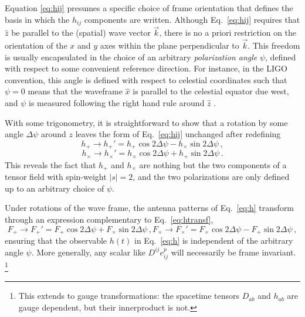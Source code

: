\documentclass[aps,prd,twocolumn,superscriptaddress,preprintnumbers,floatfix,nofootinbib]{revtex4-2}
\newcommand{\beq}{\begin{equation}}
\newcommand{\eeq}{\end{equation}}
\newcommand*{\eq}[1]{Eq.~\eqref{eq:#1}}
\begin{document}
Equation \eqref{eq:hij} presumes a specific choice of frame orientation that defines the basis in which the $h_{ij}$ components are written.
Although \eq{hij} requires that $\hat{z}$ be parallel to the (spatial) wave vector $\vec{k}$, there is no a priori restriction on the orientation of the $x$ and $y$ axes within the plane perpendicular to $\vec{k}$.
This freedom is usually encapsulated in the choice of an arbitrary \emph{polarization angle} $\psi$, defined with respect to some convenient reference direction.
For instance, in the LIGO convention, this angle is defined with respect to celestial coordinates such that $\psi=0$ means that the waveframe $\hat{x}$ is parallel to the celestial equator due west, and $\psi$ is measured following the right hand rule around $\hat{z}$ \cite{LALSuite:wave}.

With some trigonometry, it is straightforward to show that a rotation by some angle $\Delta \psi$ around $z$ leaves the form of \eq{hij} unchanged after redefining
\beq \label{eq:htransf}
h_+ \rightarrow h_+' = h_+ \cos 2\Delta \psi - h_\times \sin 2\Delta\psi \, ,
\eeq
\beq
h_\times \rightarrow h_\times' = h_\times \cos 2\Delta \psi + h_+ \sin 2\Delta\psi \, .
\eeq
This reveals the fact that $h_+$ and $h_\times$ are nothing but the two components of a tensor field with spin-weight $|s|=2$, and the two polarizations are only defined up to an arbitrary choice of $\psi$.

Under rotations of the wave frame, the antenna patterns of \eq{h} transform through an expression complementary to \eq{htransf},
\begin{subequations} \label{eq:Ftransf}
\beq
F_+ \rightarrow F_+' = F_+ \cos 2\Delta \psi + F_\times \sin 2\Delta\psi \, ,
\eeq
\beq
F_\times \rightarrow F_\times' = F_\times \cos 2\Delta \psi - F_+ \sin 2\Delta\psi \, ,
\eeq
\end{subequations}
ensuring that the observable $h(t)$ in \eq{h} is independent of the arbitrary angle $\psi$.
More generally, any scalar like $D^{ij} e^{p}_{ij}$ will necessarily be frame invariant.%
\footnote{This extends to gauge transformations: the spacetime tensors $D_{ab}$ and $h_{ab}$ are gauge dependent, but their innerproduct is not.}
\end{document}
